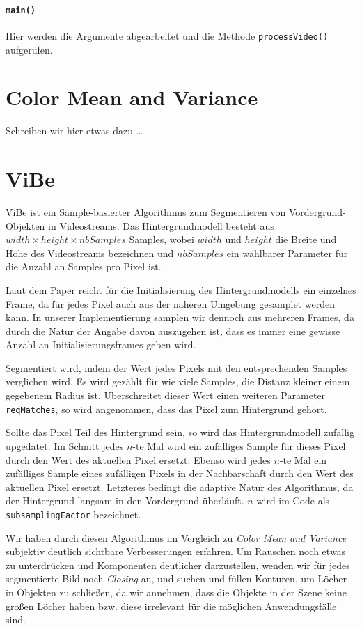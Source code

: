 \documentclass[]{scrartcl}
\begin{document}
\paragraph{\texttt{main()}} Hier werden die Argumente abgearbeitet und die Methode \texttt{processVideo()} aufgerufen.

\section{Color Mean and Variance}\label{sec:cmv}
Schreiben wir hier etwas dazu \dots

\section{ViBe}\label{sec:vibe}
ViBe ist ein Sample-basierter Algorithmus zum Segmentieren von Vordergrund-Objekten in Videostreams. Das Hintergrundmodell besteht aus $width \times height \times nbSamples$ Samples, wobei $width$ und $height$ die Breite und H\"ohe des Videostreams bezeichnen und $nbSamples$ ein w\"ahlbarer Parameter f\"ur die Anzahl an Samples pro Pixel ist. 

Laut dem Paper reicht f\"ur die Initialisierung des Hintergrundmodells ein einzelnes Frame, da f\"ur jedes Pixel auch aus der n\"aheren Umgebung gesamplet werden kann. In unserer Implementierung samplen wir dennoch aus mehreren Frames, da durch die Natur der Angabe davon auszugehen ist, dass es immer eine gewisse Anzahl an Initialisierungsframes geben wird. 

Segmentiert wird, indem der Wert jedes Pixels mit den entsprechenden Samples verglichen wird. Es wird gez\"ahlt f\"ur wie viele Samples, die Distanz kleiner einem gegebenem Radius ist. \"Uberschreitet dieser Wert einen weiteren Parameter \texttt{reqMatches}, so wird angenommen, dass das Pixel zum Hintergrund geh\"ort.

Sollte das Pixel Teil des Hintergrund sein, so wird das Hintergrundmodell zuf\"allig upgedatet. Im Schnitt jedes $n$-te Mal wird ein zuf\"alliges Sample f\"ur dieses Pixel durch den Wert des aktuellen Pixel ersetzt. Ebenso wird jedes $n$-te Mal ein zuf\"alliges Sample eines zuf\"alligen Pixels in der Nachbarschaft durch den Wert des aktuellen Pixel ersetzt. Letzteres bedingt die adaptive Natur des Algorithmus, da der Hintergrund langsam in den Vordergrund \"uberl\"auft. $n$ wird im Code als \texttt{subsamplingFactor} bezeichnet.

Wir haben durch diesen Algorithmus im Vergleich zu \textit{Color Mean and Variance} subjektiv deutlich sichtbare Verbesserungen erfahren. Um Rauschen noch etwas zu unterdr\"ucken und Komponenten deutlicher darzustellen, wenden wir f\"ur jedes segmentierte Bild noch \textit{Closing} an, und suchen und f\"ullen Konturen, um L\"ocher in Objekten zu schließen, da wir annehmen, dass die Objekte in der Szene keine gro\ss{}en L\"ocher haben bzw. diese irrelevant f\"ur die m\"oglichen Anwendungsf\"alle sind.
\end{document}
